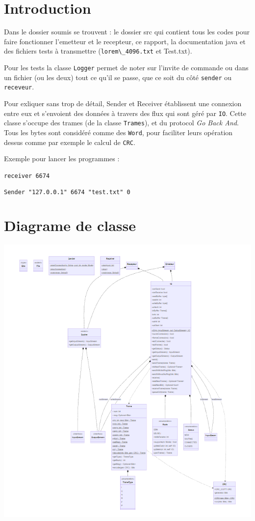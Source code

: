 \documentclass{article}
\begin{document}
\section{Introduction}

Dans le dossier soumis se trouvent : le dossier src qui contient tous les codes pour faire fonctionner l'emetteur et le recepteur, ce rapport, la documentation java et des fichiers tests à transmettre (\verb#lorem\_4096.txt# et Test.txt).

\hfill

Pour les tests la classe \verb#Logger# permet de noter sur l'invite de commande ou dans un fichier (ou les deux) tout ce qu'il se passe, que ce soit du côté \verb#sender# ou \verb#receveur#.

\hfill

Pour exliquer sans trop de détail, Sender et Receiver établissent une connexion entre eux et s'envoient des données à travers des flux qui sont géré par \verb#IO#. Cette classe s'occupe des trames (de la classe \verb#Trames#), et du protocol \emph{Go Back And}. Tous les bytes sont considéré comme des \verb#Word#, pour faciliter leurs opération dessus comme par exemple le calcul de \verb#CRC#.

\hfill

\hfill

Exemple pour lancer les programmes :

\hfill

\verb#receiver 6674#

\hfill

\verb#Sender "127.0.0.1" 6674 "test.txt" 0#

\clearpage

\section{Diagrame de classe}

\includegraphics[scale=1]{dc.png}
\end{document}
